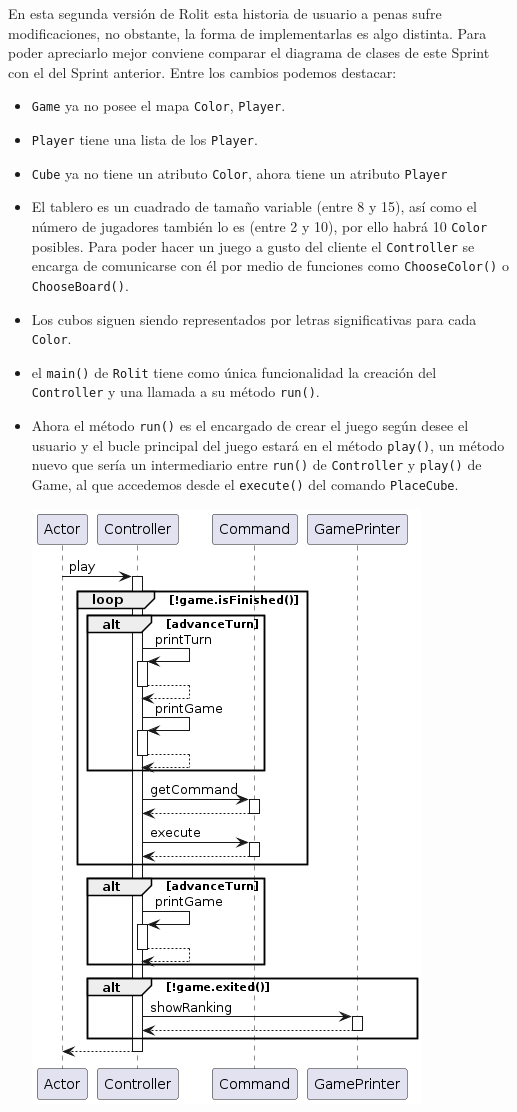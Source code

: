\documentclass[../DocumentoOficial.tex]{subfiles}
\begin{document}
\begin{sprint}[2]
En esta segunda versión de Rolit esta historia de usuario a penas sufre modificaciones, no obstante, la forma de implementarlas es algo distinta. Para poder apreciarlo mejor conviene comparar el diagrama de clases de este Sprint con el del Sprint anterior. Entre los cambios podemos destacar:
\begin{itemize}
\item \texttt{Game} ya no posee el mapa \texttt{Color}, \texttt{Player}.
\item \texttt{Player} tiene una lista de los \texttt{Player}.
\item \texttt{Cube} ya no tiene un atributo \texttt{Color}, ahora tiene un atributo \texttt{Player}
\item El tablero es un cuadrado de tamaño variable (entre 8 y 15), así como el número de jugadores también lo es (entre 2 y 10), por ello habrá 10 \texttt{Color} posibles. Para poder hacer un juego a gusto del cliente el \texttt{Controller} se encarga de comunicarse con él por medio de funciones como \texttt{ChooseColor()} o \texttt{ChooseBoard()}. 
\item Los cubos siguen siendo representados por letras significativas para cada \texttt{Color}.
\item el \texttt{main()} de \texttt{Rolit} tiene como única funcionalidad la creación del \texttt{Controller} y una llamada a su método \texttt{run()}.
\item Ahora el método \texttt{run()} es el encargado de crear el juego según desee el usuario y el bucle principal del juego estará en el método \texttt{play()}, un método nuevo que sería un intermediario entre \texttt{run()} de \texttt{Controller} y \texttt{play()} de Game, al que accedemos desde el \texttt{execute()} del comando \texttt{PlaceCube}.
\begin{center}
\includegraphics[scale=0.55]{playS2.png}

\end{center}
\end{itemize}
\end{sprint}
\end{document}
